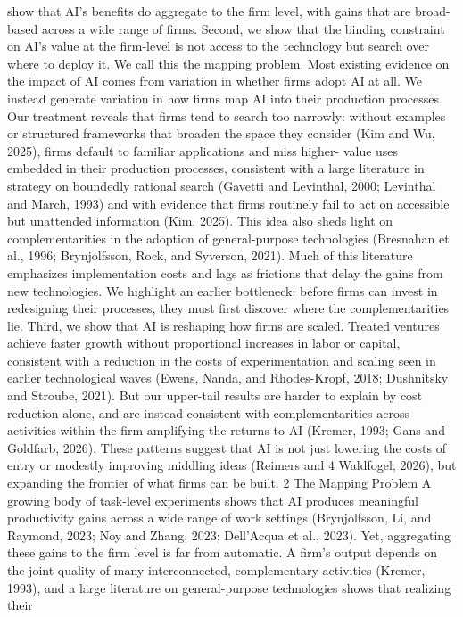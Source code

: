 show that AI’s benefits do aggregate to the firm level, with gains that are broad-based across a wide
range of firms.
Second, we show that the binding constraint on AI’s value at the firm-level is not access to the
technology but search over where to deploy it. We call this the mapping problem. Most existing
evidence on the impact of AI comes from variation in whether firms adopt AI at all. We instead
generate variation in how firms map AI into their production processes. Our treatment reveals that
firms tend to search too narrowly: without examples or structured frameworks that broaden the
space they consider (Kim and Wu, 2025), firms default to familiar applications and miss higher-
value uses embedded in their production processes, consistent with a large literature in strategy
on boundedly rational search (Gavetti and Levinthal, 2000; Levinthal and March, 1993) and with
evidence that firms routinely fail to act on accessible but unattended information (Kim, 2025).
This idea also sheds light on complementarities in the adoption of general-purpose technologies
(Bresnahan et al., 1996; Brynjolfsson, Rock, and Syverson, 2021). Much of this literature emphasizes
implementation costs and lags as frictions that delay the gains from new technologies. We highlight
an earlier bottleneck: before firms can invest in redesigning their processes, they must first discover
where the complementarities lie.
Third, we show that AI is reshaping how firms are scaled.
Treated ventures achieve faster
growth without proportional increases in labor or capital, consistent with a reduction in the costs of
experimentation and scaling seen in earlier technological waves (Ewens, Nanda, and Rhodes-Kropf,
2018; Dushnitsky and Stroube, 2021).
But our upper-tail results are harder to explain by cost
reduction alone, and are instead consistent with complementarities across activities within the firm
amplifying the returns to AI (Kremer, 1993; Gans and Goldfarb, 2026). These patterns suggest
that AI is not just lowering the costs of entry or modestly improving middling ideas (Reimers and
4
Waldfogel, 2026), but expanding the frontier of what firms can be built.
2
The Mapping Problem
A growing body of task-level experiments shows that AI produces meaningful productivity gains
across a wide range of work settings (Brynjolfsson, Li, and Raymond, 2023; Noy and Zhang, 2023;
Dell’Acqua et al., 2023).
Yet, aggregating these gains to the firm level is far from automatic.
A firm’s output depends on the joint quality of many interconnected, complementary activities
(Kremer, 1993), and a large literature on general-purpose technologies shows that realizing their
